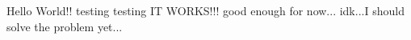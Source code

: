 \documentclass{article}
\begin{document}
  Hello World!! testing testing IT WORKS!!! good enough for now...
  idk...I should solve the problem yet...
\end{document}
